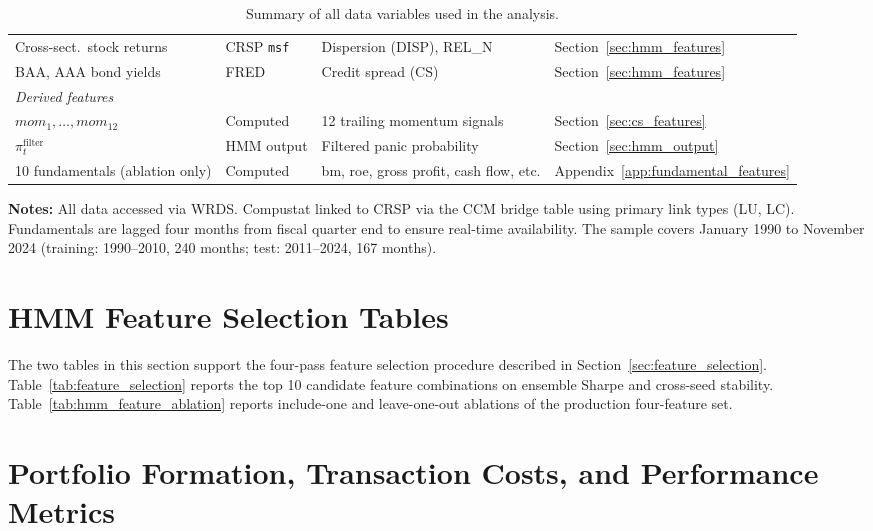 \begin{table}[H]
{\begin{tabular}{l l l l}
Cross-sect.\ stock returns & CRSP \texttt{msf} & Dispersion (DISP), REL\_N & Section~\ref{sec:hmm_features} \\
BAA, AAA bond yields & FRED & Credit spread (CS) & Section~\ref{sec:hmm_features} \\
\midrule
\multicolumn{4}{l}{\emph{Derived features}} \\
$mom_1, \dots, mom_{12}$ & Computed & 12 trailing momentum signals & Section~\ref{sec:cs_features} \\
$\pi_t^{\text{filter}}$ & HMM output & Filtered panic probability & Section~\ref{sec:hmm_output} \\
10 fundamentals (ablation only) & Computed & bm, roe, gross profit, cash flow, etc. & Appendix~\ref{app:fundamental_features} \\
\bottomrule
\end{tabular}%
}
\caption{Summary of all data variables used in the analysis.}
\label{tab:data_summary}

\medskip
\small
\textbf{Notes:} All data accessed via WRDS. Compustat linked to CRSP via the CCM bridge table using primary link types (LU, LC). Fundamentals are lagged four months from fiscal quarter end to ensure real-time availability. The sample covers January 1990 to November 2024 (training: 1990--2010, 240 months; test: 2011--2024, 167 months).
\end{table}

\section{HMM Feature Selection Tables}\label{app:hmm_feature_tables}

The two tables in this section support the four-pass feature selection procedure described in Section~\ref{sec:feature_selection}. Table~\ref{tab:feature_selection} reports the top 10 candidate feature combinations on ensemble Sharpe and cross-seed stability. Table~\ref{tab:hmm_feature_ablation} reports include-one and leave-one-out ablations of the production four-feature set.





\section{Portfolio Formation, Transaction Costs, and Performance Metrics}\label{app:portfolio}

